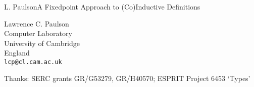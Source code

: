 
\def\printlandscape{\special{landscape}}    %

\extraslideheight{30pt}

\renewcommand\slidefuzz{6pt}
\sloppy{}   %

\newcommand\sbs{\subseteq}
\newcommand\Pow{{\cal P}}
\newcommand\lfp{\hbox{\tt lfp}}
\newcommand\gfp{\hbox{\tt gfp}}
\newcommand\lst{\hbox{\tt list}}
\newcommand\term{\hbox{\tt term}}

\newcommand\heading[1]{%
  \begin{center}\large\bf\shadowbox{#1}\end{center}
  \vspace{1ex minus 1ex}}

%
  {L. Paulson\hfil A Fixedpoint Approach to (Co)Inductive Definitions\hfil
      \thepage}%
  {\hfil{}\hfil}
\pagestyle{mine}



\slidefonts

\begin{slide}\centering
{}
\bigskip

    \begin{Bcenter}
    Lawrence C. Paulson\\
    Computer Laboratory\\
    University of Cambridge\\
    England\\[1ex]
    \verb|lcp@cl.cam.ac.uk|
    \end{Bcenter}
\bigskip

{\footnotesize Thanks: SERC grants GR/G53279, GR/H40570; ESPRIT Project 6453
  `Types'} 
\end{slide}


